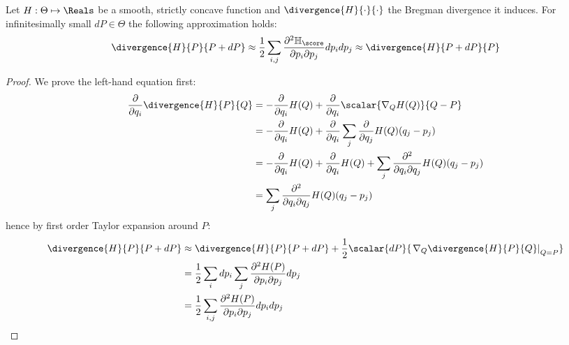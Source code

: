 \begin{statement}
	Let $H:\Theta\mapsto\Reals$ be a smooth, strictly concave function and $\divergence{H}{\cdot}{\cdot}$ the Bregman divergence it induces. For infinitesimally small $dP\in\Theta$ the following approximation holds:
	\begin{equation}
		\divergence{H}{P}{P+ dP} \approx \frac{1}{2} \sum_{i,j} \frac{\partial^2 \mathbb{H}_{\score}}{\partial p_i\partial p_j} dp_{i} dp_{j} \approx   \divergence{H}{P + dP}{P}
	\end{equation}
	\begin{proof}
		We prove the left-hand equation first:
		\begin{align}
			\frac{\partial}{\partial q_i} \divergence{H}{P}{Q} &=  -\frac{\partial}{\partial q_i} H(Q) +    \frac{\partial}{\partial q_i}\scalar{\nabla_{Q} H(Q)}{Q-P}\\
				&=  - \frac{\partial}{\partial q_i} H(Q) +  \frac{\partial}{\partial q_i}\sum_{j} \frac{\partial}{\partial q_j} H(Q) (q_j - p_j)\\
				&= - \frac{\partial}{\partial q_i} H(Q)  + \frac{\partial}{\partial q_i} H(Q) + \sum_{j} \frac{\partial^2}{\partial q_i \partial q_j} H(Q) (q_j - p_j)\\
				&= \sum_{j} \frac{\partial^2}{\partial q_i \partial q_j} H(Q) (q_j - p_j)
		\end{align}
		hence by first order Taylor expansion around $P$:
		\begin{align}
			\divergence{H}{P}{P+dP} &\approx  \divergence{H}{P}{P+dP}+ \frac{1}{2}\scalar{dP}{\left.\nabla_{Q}\divergence{H}{P}{Q}\right\rvert_{Q=P}}\\
				&= \frac{1}{2} \sum_{i} dp_i \sum_{j} \frac{\partial^2 H(P)}{\partial p_i\partial p_j} dp_j \\
				&= \frac{1}{2} \sum_{i,j} \frac{\partial^2 H(P)}{\partial p_i\partial p_j} dp_{i} dp_j
		\end{align}
		

\end{proof}
\end{statement}
